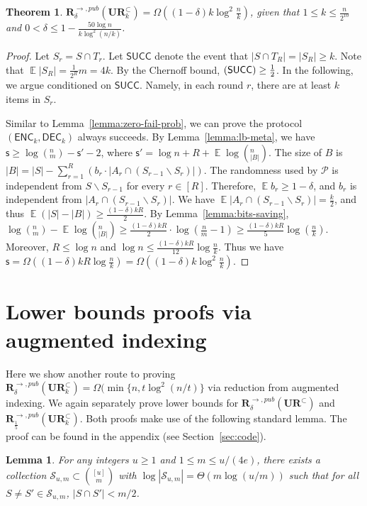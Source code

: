 \documentclass[11pt]{article}
\newtheorem{theorem}{Theorem}
\newtheorem{lemma}{Lemma}
\DeclareMathOperator*{\E}{\mathbb{E}}
\let\Pr\relax
\DeclareMathOperator*{\Pr}{\mathbb{P}}
\newcommand{\success}{\textsf{SUCC}\xspace}
\newcommand{\enc}{\textsf{ENC}\xspace}
\newcommand{\dec}{\textsf{DEC}\xspace}
\newcommand{\s}{\textsf{s}\xspace}
\newcommand{\ur}{\mathbf{UR}\xspace}
\newcommand{\randcom}{\mathbf{R}}
\begin{document}
\begin{theorem}\label{thm:urk}
  $\randcom^{\rightarrow,pub}_\delta(\ur_k^\subset) = \Omega((1-\delta)k\log^2 \frac{n}{k} )$, given that $1 \le k \le \frac{n}{2^{10}}$ and $0<\delta \le 1-\frac{50\log n}{k\log^2(n/k)}$.
\end{theorem}
\begin{proof}
Let $S_r=S\cap T_r$.  Let $\success$ denote the event that $|S\cap T_R|=|S_R|\ge k$.  Note that $\E|S_R|=\frac{1}{2^R}m=4k$. By the Chernoff bound, $\Pr(\success)\ge \frac{1}{2}$.  In the following, we argue conditioned on $\success$. Namely, in each round $r$, there are at least $k$ items in $S_r$.
  
Similar to Lemma~\ref{lemma:zero-fail-prob}, we can prove the protocol $(\enc_k,\dec_k)$ always succeeds.  By Lemma~\ref{lemma:lb-meta}, we have $\s\ge \log (^n_m) - \s' -2$, where $\s'=\log n + R+ \E \log (^n_{|B|})$.  The size of $B$ is $|B|=|S|-\sum_{r=1}^{R}{(b_r \cdot |A_r \cap (S_{r-1}\backslash S_r)|)}$.  The randomness used by $\mathcal{P}$ is independent from $S\backslash S_{r-1}$ for every $r\in[R]$.  Therefore, $\E b_r\ge 1-\delta$, and $b_r$ is independent from $|A_r \cap (S_{r-1}\backslash S_r)|$.  We have $\E|A_r \cap (S_{r-1}\backslash S_r)|=\frac{k}{2}$, and thus $\E(|S|-|B|)\ge \frac{(1-\delta)kR}{2}$.  By Lemma~\ref{lemma:bits-saving}, $\log (^n_m)-\E\log (^n_{|B|})\ge \frac{(1-\delta)kR}{2}\cdot \log (\frac{n}{m}-1) \ge \frac{(1-\delta)kR}{5}\log (\frac{n}{k})$.  Moreover, $R\le \log n$ and $\log n \le \frac{(1-\delta)kR}{12}\log \frac{n}{k}$.  Thus we have $\s = \Omega((1-\delta)kR\log\frac{n}{k}) = \Omega((1-\delta)k\log^2 \frac{n}{k} )$.
\end{proof}

\section{Lower bounds proofs via augmented indexing}\label{sec:aug-proof}

Here we show another route to proving $\randcom^{\rightarrow,pub}_\delta(\ur_k^\subset) = \Omega(\min\{n, t\log^2(n/t)\}$ via reduction from augmented indexing. We again separately prove lower bounds for $\randcom^{\rightarrow,pub}_\delta(\ur^\subset)$ and $\randcom^{\rightarrow,pub}_{\frac 15}(\ur_k^\subset)$. Both proofs make use of the following standard lemma. The proof can be found in the appendix (see Section~\ref{sec:code}).

\begin{lemma}\label{lem:code}
For any integers $u\ge 1$ and $1\le m\le u/(4e)$, there exists a collection $\mathcal S_{u,m} \subset \binom{[u]}m$ with $\log |\mathcal{S}_{u,m}| = \Theta(m\log(u/m))$ such that for all $S\neq S'\in \mathcal S_{u,m}$, $|S\cap S'| < m/2$.
\end{lemma}
\end{document}
